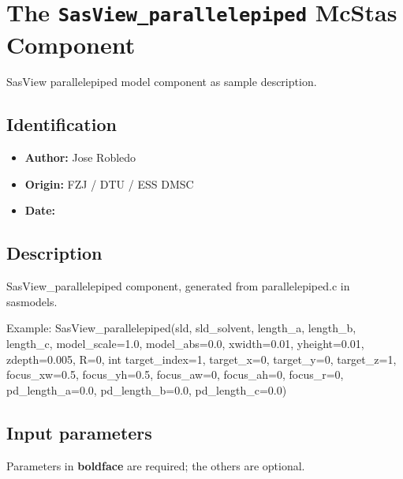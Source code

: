 \section{The \texttt{SasView\_parallelepiped} McStas Component}
SasView parallelepiped model component as sample description.

\subsection*{Identification}
\begin{itemize}
  \item \textbf{Author:} Jose Robledo
  \item \textbf{Origin:} FZJ / DTU / ESS DMSC
  \item \textbf{Date:} 
\end{itemize}

\subsection*{Description}
SasView\_parallelepiped component, generated from parallelepiped.c in sasmodels.

Example: SasView\_parallelepiped(sld, sld\_solvent, length\_a, length\_b, length\_c, model\_scale=1.0, model\_abs=0.0, xwidth=0.01, yheight=0.01, zdepth=0.005, R=0, int target\_index=1, target\_x=0, target\_y=0, target\_z=1, focus\_xw=0.5, focus\_yh=0.5, focus\_aw=0, focus\_ah=0, focus\_r=0, pd\_length\_a=0.0, pd\_length\_b=0.0, pd\_length\_c=0.0)

\subsection*{Input parameters}
Parameters in \textbf{boldface} are required; the others are optional.

